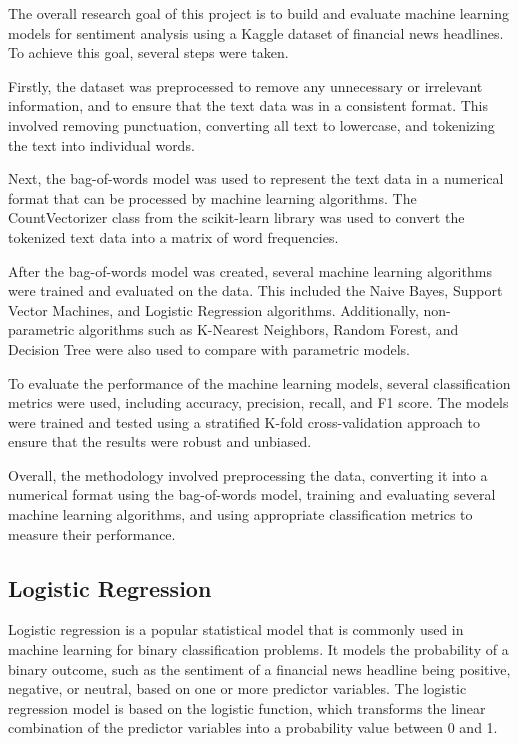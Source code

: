 \documentclass{article}
\begin{document}
The overall research goal of this project is to build and evaluate machine learning models for sentiment analysis using a Kaggle dataset of financial news headlines. To achieve this goal, several steps were taken.

Firstly, the dataset was preprocessed to remove any unnecessary or irrelevant information, and to ensure that the text data was in a consistent format. This involved removing punctuation, converting all text to lowercase, and tokenizing the text into individual words.

Next, the bag-of-words model was used to represent the text data in a numerical format that can be processed by machine learning algorithms. The CountVectorizer class from the scikit-learn library was used to convert the tokenized text data into a matrix of word frequencies.

After the bag-of-words model was created, several machine learning algorithms were trained and evaluated on the data. This included the Naive Bayes, Support Vector Machines, and Logistic Regression algorithms. Additionally, non-parametric algorithms such as K-Nearest Neighbors, Random Forest, and Decision Tree were also used to compare with parametric models.

To evaluate the performance of the machine learning models, several classification metrics were used, including accuracy, precision, recall, and F1 score. The models were trained and tested using a stratified K-fold cross-validation approach to ensure that the results were robust and unbiased.

Overall, the methodology involved preprocessing the data, converting it into a numerical format using the bag-of-words model, training and evaluating several machine learning algorithms, and using appropriate classification metrics to measure their performance.

\subsection{Logistic Regression}

Logistic regression is a popular statistical model that is commonly used in machine learning for binary classification problems. It models the probability of a binary outcome, such as the sentiment of a financial news headline being positive, negative, or neutral, based on one or more predictor variables. The logistic regression model is based on the logistic function, which transforms the linear combination of the predictor variables into a probability value between 0 and 1.
\end{document}
